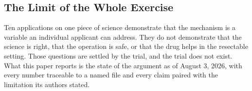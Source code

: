 \subsection{The Limit of the Whole Exercise}

Ten applications on one piece of science demonstrate that the mechanism is a
variable an individual applicant can address. They do not demonstrate that the
science is right, that the operation is safe, or that the drug helps in the
resectable setting. Those questions are settled by the trial, and the trial does
not exist. What this paper reports is the state of the argument as of August 3,
2026, with every number traceable to a named file and every claim paired with
the limitation its authors stated.

